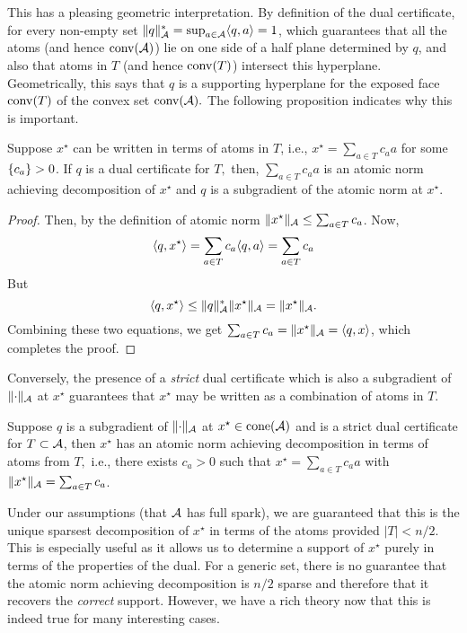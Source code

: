 This has a pleasing geometric interpretation. By definition of the dual
certificate, for every non-empty set $\lVert q\rVert_{\mathcal{A}}^* = \sup_{a \in \mathcal{A}}
\langle q, a\rangle = 1$, which guarantees that all the atoms (and hence $\operatorname{conv}(\mathcal{A})$)
lie on one side of a half plane determined by $q$, and also that atoms in $T$
(and hence $\operatorname{conv}(T)$) intersect this hyperplane. Geometrically, this says that
$q$ is a supporting hyperplane for the exposed face $\operatorname{conv}(T)$ of the convex set
$\operatorname{conv}(\mathcal{A}).$ The following proposition indicates why this is important.

\begin{prop}
\label{prop:dual-certificate-is-subgrad}
Suppose $x^\star$ can be written in terms of atoms in $T$, i.e., $x^\star =
\sum_{a \in T} c_a a$ for some $\left\{ c_a \right\} > 0$. If $q$ is a dual certificate for
$T,$ then, $\sum_{a \in T} c_a a$ is an atomic norm achieving decomposition of
$x^\star$ and $q$ is a subgradient of the atomic norm at $x^\star.$
\end{prop}
\begin{proof}
	Then, by the definition of atomic norm $\lVert x^\star\rVert_{\mathcal{A}} \leq \sum_{a \in T} c_a$. Now, 
	\[
		\langle q, x^\star\rangle = \sum_{a \in T} c_a\langle q, a\rangle = \sum_{a \in T} c_a
	\]
	But 
	\[
		\langle q, x^\star\rangle \leq \lVert q\rVert_{\mathcal{A}}^* \lVert x^\star\rVert_{\mathcal{A}} = \lVert x^\star\rVert_{\mathcal{A}}.
	\]
	Combining these two equations, we get $\sum_{a \in T} c_a = \lVert x^\star\rVert_{\mathcal{A}} =
	\langle q, x\rangle$, which completes the proof.
\end{proof}

Conversely, the presence of a \emph{strict} dual certificate which is also a
subgradient of $\lVert\cdot\rVert_{\mathcal{A}}$ at $x^\star$ guarantees that $x^\star$ may be
written as a combination of atoms in $T.$ 

\begin{prop}\label{prop:certificate-support}
Suppose $q$ is a subgradient of $\lVert\cdot\rVert_{\mathcal{A}}$ at $x^\star \in \operatorname{cone}(\mathcal{A})$ and is a strict dual certificate for $T \subset \mathcal{A}$, then $x^\star$ has an atomic norm achieving decomposition in terms of atoms from $T,$ i.e., there exists $c_a > 0$ such that $x^\star = \sum_{a \in T}c_a a$ with $\lVert x^\star\rVert_{\mathcal{A}} = \sum_{a \in T}c_a$.
\end{prop}

Under our assumptions (that $\mathcal{A}$ has full spark), we are guaranteed that this is
the unique sparsest decomposition of $x^\star$ in terms of the atoms provided
$|T| < n/2$. This is especially useful as it allows us to determine a support of
$x^\star$ purely in terms of the properties of the dual. For a generic set, there is no guarantee that the atomic norm achieving decomposition is $n/2$ sparse and therefore that it recovers the \emph{correct} support. However, we have a rich theory now that this is indeed true for many interesting cases.

